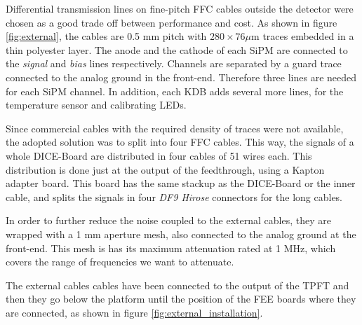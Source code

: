 Differential transmission lines on fine-pitch FFC cables outside the detector were chosen as a good trade off between performance and cost. As shown in figure \ref{fig:external}, the cables are 0.5 mm pitch with $280 \times 76 \mu$m traces embedded in a thin polyester layer. The anode and the cathode of each SiPM are connected to the \textit{signal} and \textit{bias} lines respectively. Channels are separated by a guard trace connected to the analog ground in the front-end. Therefore three lines are needed for each SiPM channel. In addition, each KDB adds several more lines, for the  temperature sensor and  calibrating LEDs.


Since commercial cables with the required density of traces were not available, the adopted solution was to split into four FFC cables. This way, the signals of a whole DICE-Board are distributed in four cables of 51 wires each. This distribution is done just at the output of the feedthrough, using a Kapton adapter board. This board has the same stackup as the DICE-Board or the inner cable, and splits the signals in four \textit{DF9 Hirose} connectors for the long cables.

In order to further reduce the noise coupled to the external cables, they are wrapped with a 1 mm aperture mesh, also connected to the analog ground at the front-end. This mesh is has its maximum attenuation rated at 1 MHz, which covers the range of frequencies we want to attenuate.

The external cables cables have been connected to the output of the TPFT and then they go below the platform until the position of the FEE boards where they are connected, as shown in figure \ref{fig:external_installation}.

